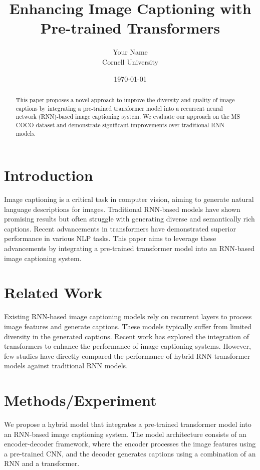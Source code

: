\documentclass{article}
\title{Enhancing Image Captioning with Pre-trained Transformers}
\author{Your Name \\ Cornell University}
\date{\today}
\begin{document}
\maketitle

\begin{abstract}
This paper proposes a novel approach to improve the diversity and quality of image captions by integrating a pre-trained transformer model into a recurrent neural network (RNN)-based image captioning system. We evaluate our approach on the MS COCO dataset and demonstrate significant improvements over traditional RNN models.
\end{abstract}

\section{Introduction}
Image captioning is a critical task in computer vision, aiming to generate natural language descriptions for images. Traditional RNN-based models have shown promising results but often struggle with generating diverse and semantically rich captions. Recent advancements in transformers have demonstrated superior performance in various NLP tasks. This paper aims to leverage these advancements by integrating a pre-trained transformer model into an RNN-based image captioning system.

\section{Related Work}
Existing RNN-based image captioning models rely on recurrent layers to process image features and generate captions. These models typically suffer from limited diversity in the generated captions. Recent work has explored the integration of transformers to enhance the performance of image captioning systems. However, few studies have directly compared the performance of hybrid RNN-transformer models against traditional RNN models.

\section{Methods/Experiment}
We propose a hybrid model that integrates a pre-trained transformer model into an RNN-based image captioning system. The model architecture consists of an encoder-decoder framework, where the encoder processes the image features using a pre-trained CNN, and the decoder generates captions using a combination of an RNN and a transformer.
\end{document}

